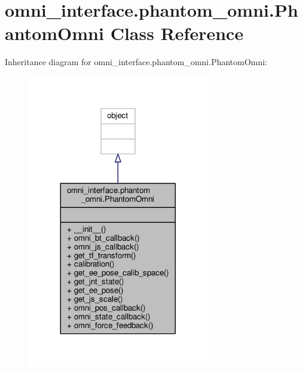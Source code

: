 \hypertarget{classomni__interface_1_1phantom__omni_1_1_phantom_omni}{\section{omni\-\_\-interface.\-phantom\-\_\-omni.\-Phantom\-Omni Class Reference}
\label{classomni__interface_1_1phantom__omni_1_1_phantom_omni}
}


Inheritance diagram for omni\-\_\-interface.\-phantom\-\_\-omni.\-Phantom\-Omni\-:
\nopagebreak
\begin{figure}[H]
\begin{center}
\leavevmode
\includegraphics[width=224pt]{classomni__interface_1_1phantom__omni_1_1_phantom_omni__inherit__graph}
\end{center}
\end{figure}


